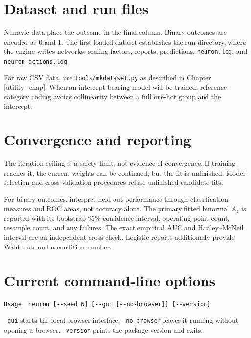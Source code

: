 \section{Dataset and run files}

Numeric data place the outcome in the final column.  Binary outcomes
are encoded as 0 and 1.  The first loaded dataset establishes the run
directory, where the engine writes networks, scaling factors, reports,
predictions, \texttt{neuron.log}, and
\texttt{neuron\_actions.log}.

For raw CSV data, use \texttt{tools/mkdataset.py} as described in
Chapter \ref{utility_chap}.  When an intercept-bearing model will be
trained, reference-category coding avoids collinearity between a full
one-hot group and the intercept.

\section{Convergence and reporting}

The iteration ceiling is a safety limit, not evidence of convergence.
If training reaches it, the current weights can be continued, but the
fit is unfinished.  Model-selection and cross-validation procedures
refuse unfinished candidate fits.

For binary outcomes, interpret held-out performance through
classification measures and ROC areas, not accuracy alone.  The
primary fitted binormal $A_z$ is reported with its bootstrap 95\%
confidence interval, operating-point count, resample count, and any
failures.  The exact empirical AUC and Hanley--McNeil interval are an
independent cross-check.  Logistic reports additionally provide Wald
tests and a condition number.

\section{Current command-line options}

\begin{verbatim}
Usage: neuron [--seed N] [--gui [--no-browser]] [--version]
\end{verbatim}

\texttt{--gui} starts the local browser interface.
\texttt{--no-browser} leaves it running without opening a browser.
\texttt{--version} prints the package version and exits.
